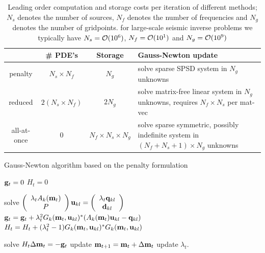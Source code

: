 \documentclass{iopart}
\begin{document}
\begin{table}
\begin{tabular}{c|c|c|p{5cm}}
         & \# PDE's & Storage & Gauss-Newton update \\
\hline
penalty  &  $N_s \times N_f $  &    $N_g$     & solve sparse SPSD system  in $N_g$ unknowns \\
\hline
reduced  &  $2(N_s \times N_f) $  &    $2N_g$     & solve matrix-free linear system in $N_g$ unknowns, requires $N_f \times N_s$ per mat-vec                   \\
\hline
all-at-once&   0   &    $N_f \times N_s \times N_g$   &  solve sparse symmetric, possibly indefinite system in $(N_f + N_s + 1) \times N_g$ unknowns \\ 
\end{tabular}
\caption{Leading order computation and storage costs per iteration of different methods; $N_s$ denotes the number of sources, $N_f$ denotes the number of frequencies and $N_g$ denotes the number of gridpoints.
for large-scale seismic inverse problems we typically have $N_s = \mathcal{O}(10^6)$, $N_f = \mathcal{O}(10^1)$ and $N_g = \mathcal{O}(10^9)$}
\label{table:costs}
\end{table}
\clearpage

\begin{algorithm}
\caption{Gauss-Newton algorithm based on the penalty formulation}
\label{GN1}
\begin{algorithmic}
\STATE $\mathbf{g}_t = 0$
\STATE $H_t = 0$

\STATE solve $\left(\begin{array}{c} \lambda_t A_k(\mathbf{m}_t) \\ P \end{array}\right)\mathbf{u}_{kl} = \left(\begin{array}{c}\lambda_t\mathbf{q}_{kl}\\ \mathbf{d}_{kl} \end{array}\right)$
\STATE $\mathbf{g}_t = \mathbf{g}_t  + \lambda_t^2G_k(\mathbf{m}_t, \mathbf{u}_{kl})^*(A_k(\mathbf{m}_t)\mathbf{u}_{kl} - \mathbf{q}_{kl})$
\STATE $H_t = H_t + (\lambda_t^2 - 1)G_k(\mathbf{m}_t, \mathbf{u}_{kl})^*G_k(\mathbf{m}_t, \mathbf{u}_{kl})$
\ENDFOR


\ENDFOR

\STATE solve $H_t\Delta \mathbf{m}_t = -\mathbf{g}_t$
\STATE update $\mathbf{m}_{t+1} = \mathbf{m}_t + \Delta \mathbf{m}_t$
\STATE update $\lambda_t$.
\ENDFOR
\end{algorithmic}
\end{algorithm}
\end{document}
